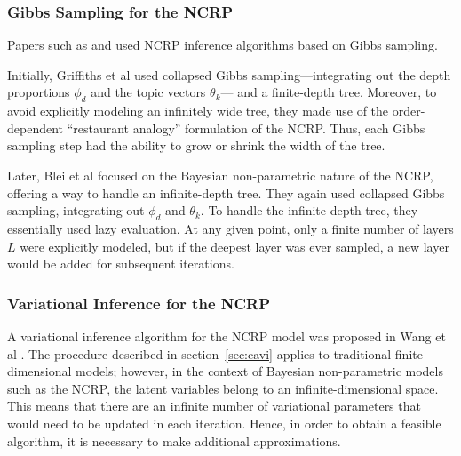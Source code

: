 \documentclass{article}
\begin{document}
\subsubsection{Gibbs Sampling for the NCRP}

Papers such as \cite{griffiths2004hierarchical} and \cite{blei2010ncrp} used NCRP inference algorithms based on Gibbs sampling.

Initially, Griffiths et al \cite{griffiths2004hierarchical} used collapsed Gibbs sampling---integrating out the depth proportions $\phi_d$ and the topic vectors $\theta_k$--- and a finite-depth tree.
Moreover, to avoid explicitly modeling an infinitely wide tree, they made use of the order-dependent ``restaurant analogy'' formulation of the NCRP.
Thus, each Gibbs sampling step had the ability to grow or shrink the width of the tree.

Later, Blei et al \cite{blei2010ncrp} focused on the Bayesian non-parametric nature of the NCRP, offering a way to handle an infinite-depth tree.
They again used collapsed Gibbs sampling, integrating out $\phi_d$ and $\theta_k$.
To handle the infinite-depth tree, they essentially used lazy evaluation.
At any given point, only a finite number of layers $L$ were explicitly modeled, but if the deepest layer was ever sampled, a new layer would be added for subsequent iterations.

\subsubsection{Variational Inference for the NCRP}

A variational inference algorithm for the NCRP model was proposed in Wang et al \cite{wang2009vi_ncrp}.
The procedure described in section~\ref{sec:cavi} applies to traditional finite-dimensional models;
however, in the context of Bayesian non-parametric models such as the NCRP, the latent variables belong to an infinite-dimensional space.
This means that there are an infinite number of variational parameters that would need to be updated in each iteration.
Hence, in order to obtain a feasible algorithm, it is necessary to make additional approximations.
\end{document}
